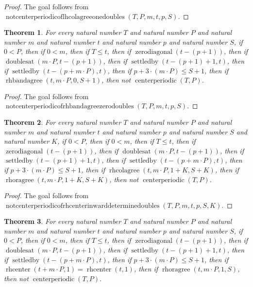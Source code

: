 \documentclass[11pt]{article}
\newtheorem{theorem}{Theorem}[section]
\theoremstyle{definition}
\begin{document}
\begin{proof}
The goal follows from \(\operatorname{notcenterperiodicoflhcolagreeonedoubles}(T, P, m, t, p, S)\).
\end{proof}
\begin{theorem}
\label{ll:paper:not-centerperiodic-of-rhbandagree-zero-doubles}
For every natural number \(T\) and natural number \(P\) and natural number \(m\) and natural number \(t\) and natural number \(p\) and natural number \(S\), if \(0 < P\), then if \(0 < m\), then if \(T \le t\), then if \(\operatorname{zerodiagonal}(t - (p + 1))\), then if \(\operatorname{doublesat}(m \cdot P, t - (p + 1))\), then if \(\operatorname{settledby}(t - (p + 1) + 1, t)\), then if \(\operatorname{settledby}(t - (p + m \cdot P), t)\), then if \(p + 3 \cdot (m \cdot P) \le S + 1\), then if \(\operatorname{rhbandagree}(t, m \cdot P, 0, S + 1)\), then not \(\operatorname{centerperiodic}(T, P)\).
\end{theorem}
\begin{proof}
The goal follows from \(\operatorname{notcenterperiodicofrhbandagreezerodoubles}(T, P, m, t, p, S)\).
\end{proof}
\begin{theorem}
\label{ll:paper:not-centerperiodic-of-rhcenter-inward-determine-doubles}
For every natural number \(T\) and natural number \(P\) and natural number \(m\) and natural number \(t\) and natural number \(p\) and natural number \(S\) and natural number \(K\), if \(0 < P\), then if \(0 < m\), then if \(T \le t\), then if \(\operatorname{zerodiagonal}(t - (p + 1))\), then if \(\operatorname{doublesat}(m \cdot P, t - (p + 1))\), then if \(\operatorname{settledby}(t - (p + 1) + 1, t)\), then if \(\operatorname{settledby}(t - (p + m \cdot P), t)\), then if \(p + 3 \cdot (m \cdot P) \le S + 1\), then if \(\operatorname{rhcolagree}(t, m \cdot P, 1 + K, S + K)\), then if \(\operatorname{rhoragree}(t, m \cdot P, 1 + K, S + K)\), then not \(\operatorname{centerperiodic}(T, P)\).
\end{theorem}
\begin{proof}
The goal follows from \(\operatorname{notcenterperiodicofrhcenterinwarddeterminedoubles}(T, P, m, t, p, S, K)\).
\end{proof}
\begin{theorem}
\label{ll:paper:not-centerperiodic-of-rhoragree-one-doubles}
For every natural number \(T\) and natural number \(P\) and natural number \(m\) and natural number \(t\) and natural number \(p\) and natural number \(S\), if \(0 < P\), then if \(0 < m\), then if \(T \le t\), then if \(\operatorname{zerodiagonal}(t - (p + 1))\), then if \(\operatorname{doublesat}(m \cdot P, t - (p + 1))\), then if \(\operatorname{settledby}(t - (p + 1) + 1, t)\), then if \(\operatorname{settledby}(t - (p + m \cdot P), t)\), then if \(p + 3 \cdot (m \cdot P) \le S + 1\), then if \(\operatorname{rhcenter}(t + m \cdot P, 1) = \operatorname{rhcenter}(t, 1)\), then if \(\operatorname{rhoragree}(t, m \cdot P, 1, S)\), then not \(\operatorname{centerperiodic}(T, P)\).
\end{theorem}
\end{document}
